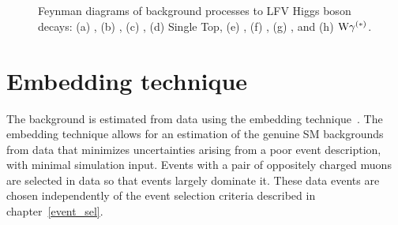 \begin{figure}[htbp!]
  \hspace{0.5cm}
  \\
  \vspace{1cm}
  \hspace{0.5cm}
  \\
  \caption{Feynman diagrams of background processes to LFV Higgs boson decays: (a) \Htt, (b) \Ztt, (c) \ttbar, (d) Single Top, (e) \PW{}\PW, (f) \PW{}\PZ, (g) \PZ{}\PZ, and (h) $\text{W}\gamma^{(\ast)}$.}
  \label{fig:feynman_bkg}
\end{figure}

\section{Embedding technique}
The \Ztt background is estimated from data using the embedding technique~\cite{Sirunyan:2019drn}. The embedding technique allows for an estimation of the genuine \Pgt{}\Pgt SM backgrounds from data that minimizes uncertainties arising from a poor event description, with minimal simulation input. Events with a pair of oppositely charged muons are selected in data so that \Zmm events largely dominate it. These data events are chosen independently of the event selection criteria described in chapter~\ref{event_sel}.

